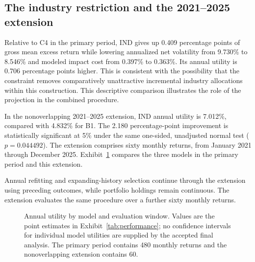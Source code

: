 \documentclass[12pt,letterpaper,fleqn]{article}
\begin{document}
\FloatBarrier
\subsection{The industry restriction and the 2021--2025 extension}
Relative to C4 in the primary period, IND gives up 0.409 percentage points of gross mean excess return while lowering annualized net volatility from 9.730\% to 8.546\% and modeled impact cost from 0.397\% to 0.363\%. Its annual utility is 0.706 percentage points higher. This is consistent with the possibility that the constraint removes comparatively unattractive incremental industry allocations within this construction. This descriptive comparison illustrates the role of the projection in the combined procedure.

In the nonoverlapping 2021--2025 extension, IND annual utility is 7.012\%, compared with 4.832\% for B1. The 2.180 percentage-point improvement is statistically significant at 5\% under the same one-sided, unadjusted normal test ($p=0.044492$). The extension comprises sixty monthly returns, from January 2021 through December 2025. Exhibit~\ref{fig:utilities} compares the three models in the primary period and this extension.

Annual refitting and expanding-history selection continue through the extension using preceding outcomes, while portfolio holdings remain continuous. The extension evaluates the same procedure over a further sixty monthly returns.

\begin{figure}[!htbp]
\centering
{}
\caption{Annual utility by model and evaluation window. Values are the point estimates in Exhibit~\ref{tab:performance}; no confidence intervals for individual model utilities are supplied by the accepted final analysis. The primary period contains 480 monthly returns and the nonoverlapping extension contains 60.}\label{fig:utilities}
\end{figure}
\end{document}
